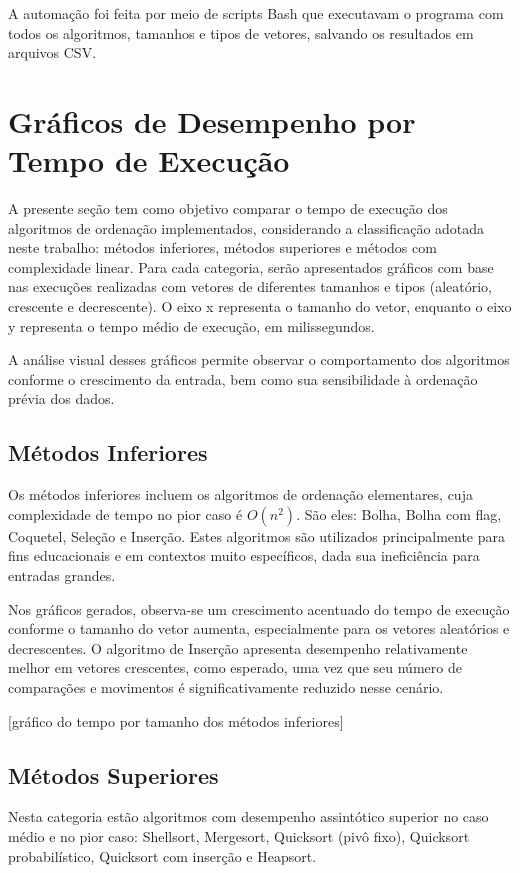 A automação foi feita por meio de scripts Bash que executavam o programa com todos os algoritmos, tamanhos e tipos de vetores, salvando os resultados em arquivos CSV.

\section{Gráficos de Desempenho por Tempo de Execução}
A presente seção tem como objetivo comparar o tempo de execução dos algoritmos de ordenação implementados, considerando a classificação adotada neste trabalho: métodos inferiores, métodos superiores e métodos com complexidade linear. Para cada categoria, serão apresentados gráficos com base nas execuções realizadas com vetores de diferentes tamanhos e tipos (aleatório, crescente e decrescente). O eixo x representa o tamanho do vetor, enquanto o eixo y representa o tempo médio de execução, em milissegundos.

A análise visual desses gráficos permite observar o comportamento dos algoritmos conforme o crescimento da entrada, bem como sua sensibilidade à ordenação prévia dos dados.

\subsection{Métodos Inferiores}
Os métodos inferiores incluem os algoritmos de ordenação elementares, cuja complexidade de tempo no pior caso é $O(n^2)$. São eles: Bolha, Bolha com flag, Coquetel, Seleção e Inserção. Estes algoritmos são utilizados principalmente para fins educacionais e em contextos muito específicos, dada sua ineficiência para entradas grandes.

Nos gráficos gerados, observa-se um crescimento acentuado do tempo de execução conforme o tamanho do vetor aumenta, especialmente para os vetores aleatórios e decrescentes. O algoritmo de Inserção apresenta desempenho relativamente melhor em vetores crescentes, como esperado, uma vez que seu número de comparações e movimentos é significativamente reduzido nesse cenário.

[gráfico do tempo por tamanho dos métodos inferiores]

\subsection{Métodos Superiores}
Nesta categoria estão algoritmos com desempenho assintótico superior no caso médio e no pior caso: Shellsort, Mergesort, Quicksort (pivô fixo), Quicksort probabilístico, Quicksort com inserção e Heapsort.

